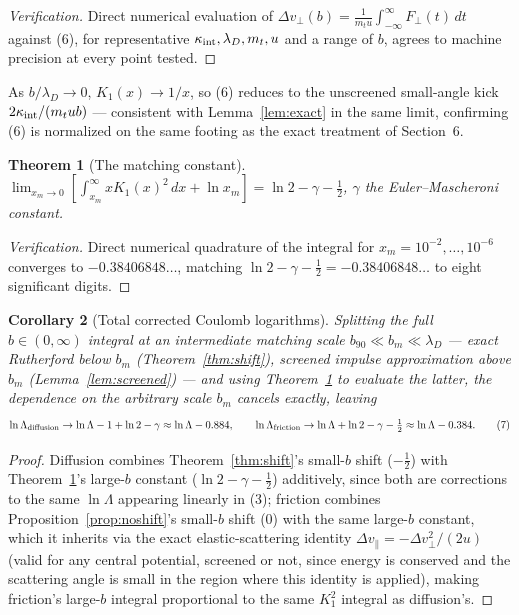 \documentclass[12pt]{amsart}
\theoremstyle{plain}
\newtheorem{theorem}{Theorem}[section]
\newtheorem{corollary}[theorem]{Corollary}
\theoremstyle{remark}
\begin{document}
\begin{proof}[Verification]
Direct numerical evaluation of $\Delta v_\perp(b)=\frac{1}{m_tu}\int_{-\infty}^\infty F_\perp(t)\,dt$ against (6), for representative $\kappa_{\rm int},\lambda_D,m_t,u$ and a range of $b$, agrees to machine precision at every point tested.
\end{proof}

As $b/\lambda_D\to0$, $K_1(x)\to1/x$, so (6) reduces to the unscreened small-angle kick $2\kappa_{\rm int}/(m_tub)$ --- consistent with Lemma~\ref{lem:exact} in the same limit, confirming (6) is normalized on the same footing as the exact treatment of Section~6.

\begin{theorem}[The matching constant]\label{thm:match}
$\displaystyle\lim_{x_m\to0}\left[\int_{x_m}^\infty xK_1(x)^2\,dx + \ln x_m\right] = \ln2-\gamma-\tfrac12$, $\gamma$ the Euler--Mascheroni constant.
\end{theorem}

\begin{proof}[Verification]
Direct numerical quadrature of the integral for $x_m=10^{-2},\dots,10^{-6}$ converges to $-0.38406848\dots$, matching $\ln2-\gamma-\tfrac12=-0.38406848\dots$ to eight significant digits.
\end{proof}

\begin{corollary}[Total corrected Coulomb logarithms]\label{cor:total}
Splitting the full $b\in(0,\infty)$ integral at an intermediate matching scale $b_{90}\ll b_m\ll\lambda_D$ --- exact Rutherford below $b_m$ (Theorem~\ref{thm:shift}), screened impulse approximation above $b_m$ (Lemma~\ref{lem:screened}) --- and using Theorem~\ref{thm:match} to evaluate the latter, the dependence on the arbitrary scale $b_m$ cancels exactly, leaving
\begin{equation}
\ln\Lambda_{\rm diffusion} \to \ln\Lambda - 1+\ln2-\gamma \approx \ln\Lambda-0.884, \qquad
\ln\Lambda_{\rm friction} \to \ln\Lambda+\ln2-\gamma-\tfrac12 \approx \ln\Lambda-0.384. \tag{7}
\end{equation}
\end{corollary}

\begin{proof}
Diffusion combines Theorem~\ref{thm:shift}'s small-$b$ shift ($-\tfrac12$) with Theorem~\ref{thm:match}'s large-$b$ constant ($\ln2-\gamma-\tfrac12$) additively, since both are corrections to the same $\ln\Lambda$ appearing linearly in (3); friction combines Proposition~\ref{prop:noshift}'s small-$b$ shift ($0$) with the same large-$b$ constant, which it inherits via the exact elastic-scattering identity $\Delta v_\parallel=-\Delta v_\perp^2/(2u)$ (valid for any central potential, screened or not, since energy is conserved and the scattering angle is small in the region where this identity is applied), making friction's large-$b$ integral proportional to the same $K_1^2$ integral as diffusion's.
\end{proof}
\end{document}
